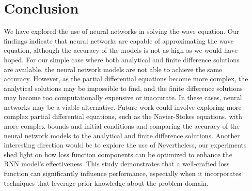 \documentclass[twoside,11pt]{report}
\begin{document}
\section{Conclusion}
\label{sec:conclusion}

    We have explored the use of neural networks in solving the wave equation. Our findings indicate that
    neural networks are capable of approximating the wave equation, although the accuracy of the models
    is not as high as we would have hoped. For our simple case where both analytical and finite difference
    solutions are available, the neural network models are not able to achieve the same accuracy. 
    However, as the partial differential equations become
    more complex, the analytical solutions may be impossible to find, and the finite difference solutions
    may become too computationally expensive or inaccurate. In these cases, neural networks may be a
    viable alternative.
    Future work could involve exploring more complex partial differential equations, such as the
    Navier-Stokes equations, with more complex bounds and initial conditions 
    and comparing the accuracy of the neural network models to the analytical
    and finite difference solutions. Another interesting direction would be to explore the use of
    Nevertheless, our experiments shed light on how loss function components can be optimized 
    to enhance the RNN model's effectiveness. This study demonstrates that a well-crafted loss 
    function can significantly influence performance, especially when it incorporates techniques 
    that leverage prior knowledge about the problem domain.
    
     





%
%
%
%




\vskip 0.2in

% 

\end{document}
